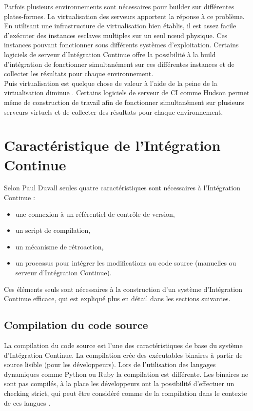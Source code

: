 \documentclass{report}
\begin{document}
      Parfois plusieurs environnements sont nécessaires pour builder sur différentes plates-formes. La virtualisation des serveurs apportent la réponse à ce problème. En utilisant une infrastructure de virtualisation bien établis, il est assez facile d’exécuter des instances esclaves multiples sur un seul nœud physique. Ces instances pouvant fonctionner sous différents systèmes d’exploitation. Certains logiciels de serveur d’Intégration Continue offre la possibilité à la build d’intégration de fonctionner simultanément sur ces différentes instances et de collecter les résultats pour chaque environnement.\\

      Puis virtualisation est quelque chose de valeur à l'aide de la peine de la virtualisation diminue \cite{Bar03}. Certains logiciels de serveur de CI comme Hudson permet même de construction de travail afin de fonctionner simultanément sur plusieurs serveurs virtuels et de collecter des résultats pour chaque environnement.


    \section{Caractéristique de l’Intégration Continue}
    Selon Paul Duvall \cite{Duv07} seules quatre caractéristiques sont nécessaires à l’Intégration Continue :\\
    \begin{itemize}
      \item une connexion à un référentiel de contrôle de version,
      \item un script de compilation,
      \item un mécanisme de rétroaction,
      \item un processus pour intégrer les modifications au code source (manuelles ou serveur d’Intégration Continue).\\
    \end{itemize}

    Ces éléments seuls sont nécessaires à la construction d’un système d’Intégration Continue efficace, qui est expliqué plus en détail dans les sections suivantes.


      \subsection{Compilation du code source}
      La compilation du code source est l'une des caractéristiques de base du système d’Intégration Continue. La compilation crée des exécutables binaires à partir de source lisible (pour les développeurs). Lors de l'utilisation des langages dynamiques comme Python ou Ruby la compilation est différente. Les binaires ne sont pas compilés, à la place les développeurs ont la possibilité d'effectuer un checking strict, qui peut être considéré comme de la compilation dans le contexte de ces langues \cite{Duv07}.
\end{document}
